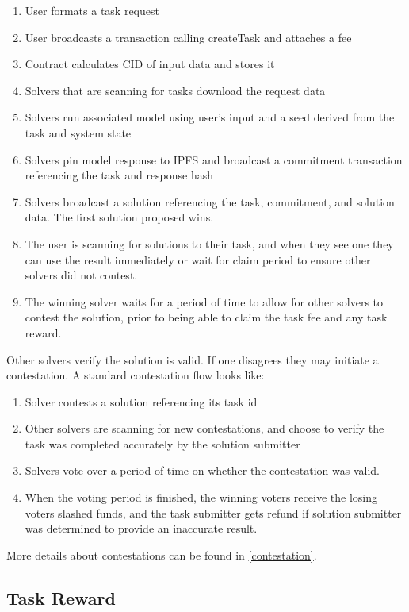 \documentclass{article}
\begin{document}
\begin{enumerate}
    \item User formats a task request
    \item User broadcasts a transaction calling createTask and attaches a fee
    \item Contract calculates CID of input data and stores it
    \item Solvers that are scanning for tasks download the request data
    \item Solvers run associated model using user's input and a seed derived from the task and system state
    \item Solvers pin model response to IPFS and broadcast a commitment transaction referencing the task and response hash
    \item Solvers broadcast a solution referencing the task, commitment, and solution data. The first solution proposed wins.
    \item The user is scanning for solutions to their task, and when they see one they can use the result immediately or wait for claim period to ensure other solvers did not contest.
    \item The winning solver waits for a period of time to allow for other solvers to contest the solution, prior to being able to claim the task fee and any task reward.
\end{enumerate}

Other solvers verify the solution is valid. If one disagrees they may initiate a contestation. A standard contestation flow looks like:

\begin{enumerate}
    \item Solver contests a solution referencing its task id
    \item Other solvers are scanning for new contestations, and choose to verify the task was completed accurately by the solution submitter
    \item Solvers vote over a period of time on whether the contestation was valid.
    \item When the voting period is finished, the winning voters receive the losing voters slashed funds, and the task submitter gets refund if solution submitter was determined to provide an inaccurate result.
\end{enumerate}

More details about contestations can be found in \ref{contestation}.

\subsection{Task Reward} \label{taskreward}
\end{document}
